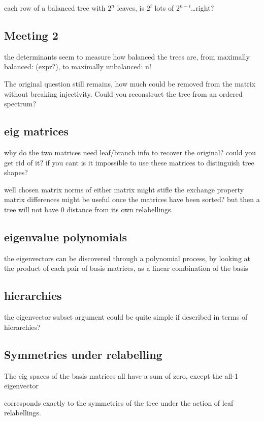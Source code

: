 \documentclass{report}
\begin{document}
each row of a balanced tree with $2^n$ leaves, is $2^i$ lots of $2^{n-i}$\ldots right?

\subsection{Meeting 2}

the determinants seem to measure how balanced the trees are, from maximally
balanced: (expr?), to maximally unbalanced: n!

The original question still remains, how much could be removed from the matrix
without breaking injectivity. Could you reconstruct the tree from an ordered
spectrum?

\subsection{eig matrices}

why do the two matrices need leaf/branch info to recover the original? could
you get rid of it? if you cant is it impossible to use these matrices to
distinguish tree shapes?

well chosen matrix norms of either matrix might stifle the exchange property
matrix differences might be useful once the matrices have been sorted? but then
a tree will not have 0 distance from its own relabellings.

\subsection{eigenvalue polynomials}

the eigenvectors can be discovered through a polynomial process, by looking at
the product of each pair of basis matrices, as a linear combination of the
basis

\subsection{hierarchies}

the eigenvector subset argument could be quite simple if described in terms of
hierarchies?

\subsection{Symmetries under relabelling}

The eig spaces of the basis matrices all have a sum of zero, except the all-1
eigenvector

corresponds exactly to the symmetries of the tree under the action of leaf
relabellings.
\end{document}
